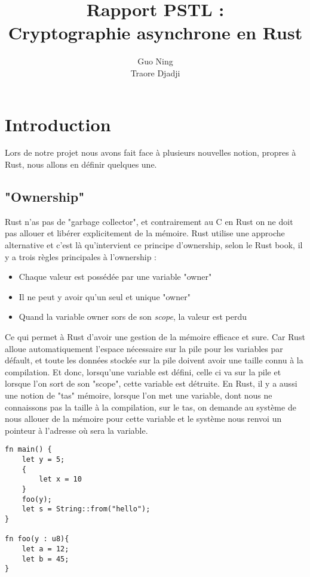 \documentclass{article}
\title{Rapport PSTL : \\ Cryptographie asynchrone en Rust}
\author{Guo Ning \\ Traore Djadji }
\begin{document}
\maketitle
\newpage


\section{Introduction}
Lors de notre projet nous avons fait face à plusieurs nouvelles notion, propres à Rust, nous allons en définir quelques une.

\subsection{"Ownership"} Rust n'as pas de "garbage collector", et contrairement au C en Rust on ne doit pas allouer et libérer explicitement de la mémoire. Rust utilise une approche alternative et c'est là qu'intervient ce principe d'ownership, selon le Rust book, il y a trois règles principales à l'ownership :

\begin{itemize}  
\item Chaque valeur est possédée par une variable "owner"
\item Il ne peut y avoir qu'un seul et unique "owner"
\item Quand la variable owner sors de son \textit{scope}, la valeur est perdu
\end{itemize}

Ce qui permet à Rust d'avoir une gestion de la mémoire efficace et sure. Car Rust alloue automatiquement l'espace nécessaire sur la pile pour les variables par défault, et toute les données stockée sur la pile doivent avoir une taille connu à la compilation. Et donc, lorsqu'une variable est défini, celle ci va sur la pile et lorsque l'on sort de son "scope", cette variable est détruite.
En Rust, il y a aussi une notion de "tas" mémoire, lorsque l'on met une variable, dont nous ne connaissons pas la taille à la compilation, sur le tas, on demande au système de nous allouer de la mémoire pour cette variable et le système nous renvoi un pointeur à l'adresse où sera la variable.

\begin{lstlisting}
fn main() {
    let y = 5;
    {
        let x = 10
    }
    foo(y);
    let s = String::from("hello");
}

fn foo(y : u8){
    let a = 12;
    let b = 45;
}
\end{lstlisting}
\end{document}

